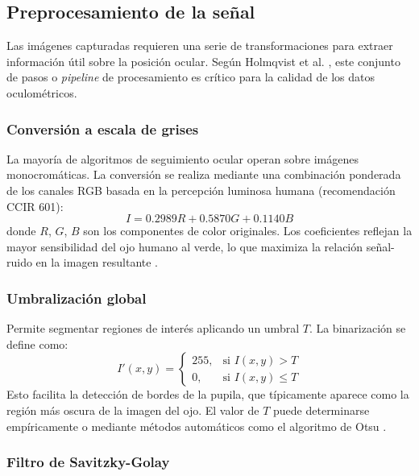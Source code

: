 \subsection{Preprocesamiento de la señal}

Las imágenes capturadas requieren una serie de transformaciones para extraer información útil sobre la posición ocular. Según Holmqvist et al. \cite{holmqvist2011eye}, este conjunto de pasos o \textit{pipeline} de procesamiento es crítico para la calidad de los datos oculométricos.

\subsubsection{Conversión a escala de grises}

La mayoría de algoritmos de seguimiento ocular operan sobre imágenes monocromáticas. La conversión se realiza mediante una combinación ponderada de los canales RGB basada en la percepción luminosa humana (recomendación CCIR 601):
\begin{equation}
	I = 0.2989R + 0.5870G + 0.1140B \tag{1}
\end{equation}
donde $R$, $G$, $B$ son los componentes de color originales. Los coeficientes reflejan la mayor sensibilidad del ojo humano al verde, lo que maximiza la relación señal-ruido en la imagen resultante \cite{duchowski2017}.

\subsubsection{Umbralización global}

Permite segmentar regiones de interés aplicando un umbral $T$. La binarización se define como:
\begin{equation}
	I'(x, y) = \begin{cases} 
		255, & \text{si } I(x, y) > T \\
		0, & \text{si } I(x, y) \leq T 
	\end{cases} \tag{2}
\end{equation}
Esto facilita la detección de bordes de la pupila, que típicamente aparece como la región más oscura de la imagen del ojo. El valor de $T$ puede determinarse empíricamente o mediante métodos automáticos como el algoritmo de Otsu \cite{holmqvist2011eye}.

\subsubsection{Filtro de Savitzky-Golay}

